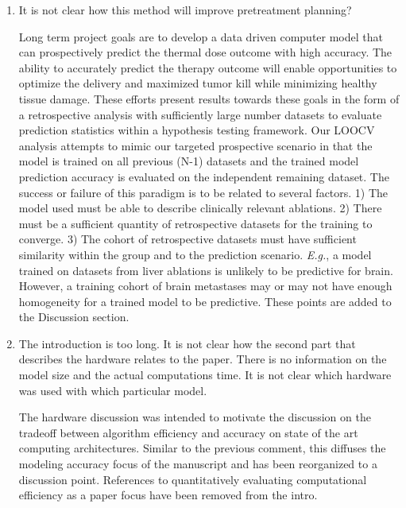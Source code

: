 \documentclass[letterpaper,12pt]{report}
\begin{document}
\begin{enumerate}
{}
\item
It is not clear how this method will improve pretreatment planning?

{\color{red}
Long term project goals are to develop a data driven computer model
that can prospectively predict the thermal dose outcome with high
accuracy. The ability to accurately predict the therapy outcome will enable
opportunities to optimize the delivery and maximized tumor kill while
minimizing healthy tissue damage. These efforts present results towards these goals
in the form of a retrospective analysis
with sufficiently large number datasets to evaluate prediction
statistics within a hypothesis testing framework. 
Our LOOCV analysis attempts to mimic our targeted prospective scenario
in that the model is trained on all previous (N-1) datasets and
the trained model prediction accuracy is evaluated on the
independent remaining dataset.
The success or failure of this paradigm is
to be related to several factors. 1) The model used must be able to
describe clinically relevant ablations. 2) There must be a sufficient
quantity of retrospective datasets for the
training to converge. 3) The cohort of retrospective datasets must have sufficient similarity within the
group and to the prediction scenario. \textit{E.g.}, a model trained on datasets from liver ablations is unlikely to
be predictive for brain. However, a training cohort of brain
metastases may or may not have enough homogeneity for a trained model
to be predictive. These points are added to the Discussion section.
}
\item
The introduction is too long. It is not clear how the second part that
describes the hardware relates to the paper.  There is no information
on the model size and the actual computations time.
It is not clear which hardware was used with which particular model. 

{\color{red}
The hardware discussion was intended to
motivate the discussion on the tradeoff between algorithm efficiency and
accuracy on state of the art computing architectures. 
Similar to the previous comment, this diffuses the modeling accuracy focus of the 
manuscript and has been reorganized to a discussion point.
References to quantitatively evaluating computational efficiency as a paper
focus have been removed from the intro.

}
\end{enumerate}
\end{document}
